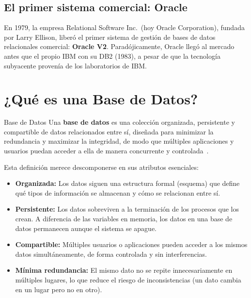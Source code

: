 \subsection{El primer sistema comercial: Oracle}

En 1979, la empresa Relational Software Inc.\ (hoy Oracle
Corporation), fundada por Larry Ellison, liberó el primer
sistema de gestión de bases de datos relacionales comercial:
\textbf{Oracle V2}.
Paradójicamente, Oracle llegó al mercado antes que el propio
IBM con su DB2 (1983), a pesar de que la tecnología subyacente
provenía de los laboratorios de IBM.


\section{¿Qué es una Base de Datos?}

\begin{definicion}{Base de Datos}
Una \textbf{base de datos} es una colección organizada, persistente
y compartible de datos relacionados entre sí, diseñada para
minimizar la redundancia y maximizar la integridad, de modo que
múltiples aplicaciones y usuarios puedan acceder a ella de manera
concurrente y controlada~\cite{date2003introduction}.
\end{definicion}

Esta definición merece descomponerse en sus atributos esenciales:

\begin{itemize}
  \item \textbf{Organizada:} Los datos siguen una estructura formal
    (esquema) que define qué tipos de información se almacenan y
    cómo se relacionan entre sí.

  \item \textbf{Persistente:} Los datos sobreviven a la terminación
    de los procesos que los crean. A diferencia de las variables en
    memoria, los datos en una base de datos permanecen aunque el
    sistema se apague.

  \item \textbf{Compartible:} Múltiples usuarios o aplicaciones
    pueden acceder a los mismos datos simultáneamente, de forma
    controlada y sin interferencias.

  \item \textbf{Mínima redundancia:} El mismo dato no se repite
    innecesariamente en múltiples lugares, lo que reduce el riesgo
    de inconsistencias (un dato cambia en un lugar pero no en otro).
\end{itemize}


